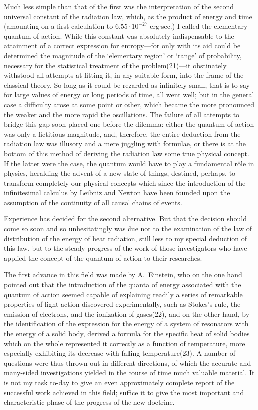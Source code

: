 \documentclass[12pt,oneside]{book}
\begin{document}
Much less simple than that of the first was the interpretation
of the second universal constant of the radiation law,
which, as the product of energy and time (amounting on a
first calculation to $6.55 \cdot 10^{-27}$ erg$\cdot$sec.) I called the elementary
quantum of action. While this constant was absolutely
indispensable to the attainment of a correct expression
for entropy---for only with its aid could be determined the
magnitude of the `elementary region' or `range' of probability,
necessary for the statistical treatment of the
problem(21)---it obstinately withstood all attempts at fitting
it, in any suitable form, into the frame of the classical
theory. So long as it could be regarded as infinitely small,
that is to say for large values of energy or long periods of
time, all went well; but in the general case a difficulty
arose at some point or other, which became the more pronounced
the weaker and the more rapid the oscillations.
The failure of all attempts to bridge this gap soon placed
one before the dilemma: either the quantum of action was
only a fictitious magnitude, and, therefore, the entire deduction
from the radiation law was illusory and a mere
juggling with formulae, or there is at the bottom of this
method of deriving the radiation law some true physical
concept. If the latter were the case, the quantum would
have to play a fundamental r\^{o}le in physics, heralding the
advent of a new state of things, destined, perhaps, to transform
completely our physical concepts which since the
introduction of the infinitesimal calculus by Leibniz and
Newton have been founded upon the assumption of the
continuity of all causal chains of events.

Experience has decided for the second alternative. But
that the decision should come so soon and so unhesitatingly
was due not to the examination of the law of distribution
of the energy of heat radiation, still less to my special
deduction of this law, but to the steady progress of the
work of those investigators who have applied the concept
of the quantum of action to their researches.

\label{Einstein}
The first advance in this field was made by A.~Einstein,
who on the one hand pointed out that the introduction of
the quanta of energy associated with the quantum of action
seemed capable of explaining readily a series of remarkable
properties of light action discovered experimentally, such
as Stokes's rule, the emission of electrons, and the ionization
of gases(22), and on the other hand, by the identification
of the expression for the energy of a system of resonators
with the energy of a solid body, derived a formula for the
specific heat of solid bodies which on the whole represented
it correctly as a function of temperature, more especially
exhibiting its decrease with falling temperature(23). A
number of questions were thus thrown out in different
directions, of which the accurate and many-sided investigations
yielded in the course of time much valuable material.
It is not my task to-day to give an even approximately
complete report of the successful work achieved in this
field; suffice it to give the most important and characteristic
phase of the progress of the new doctrine.
\end{document}
